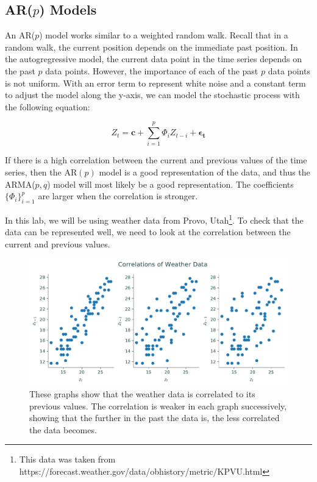 \subsection*{AR($p$) Models}

An AR($p$) model works similar to a weighted random walk.
Recall that in a random walk, the current position depends on the immediate past position.
In the autogregressive model, the current data point in the time series depends on the past $p$ data points.
However, the importance of each of the past $p$ data points is not uniform.
With an error term to represent white noise and a constant term to adjust the model along the y-axis, we can model the stochastic process with the following equation:

\begin{equation}
Z_t=\mathbf{c}  + \sum_{i=1}^p\Phi_i Z_{t-i} + \boldsymbol{\epsilon_t}
\label{eq:AR}
\end{equation}

If there is a high correlation between the current and previous values of the time series, then the AR$(p)$ model is a good representation of the data, and thus the ARMA($p,q$) model will most likely be a good representation.
The coefficients $\{\Phi_i\}_{i=1}^p$ are larger when the correlation is stronger.

In this lab, we will be using weather data from Provo, Utah\footnote{This data was taken from https://forecast.weather.gov/data/obhistory/metric/KPVU.html}.
To check that the data can be represented well, we need to look at the correlation between the current and previous values.

\begin{figure}[H]
\centering
\includegraphics[width=\textwidth]{figures/correlations.pdf}
\caption{These graphs show that the weather data is correlated to its previous values.
The correlation is weaker in each graph successively, showing that the further in the past the data is, the less correlated the data becomes.}
\label{fig:correlations}
\end{figure}


